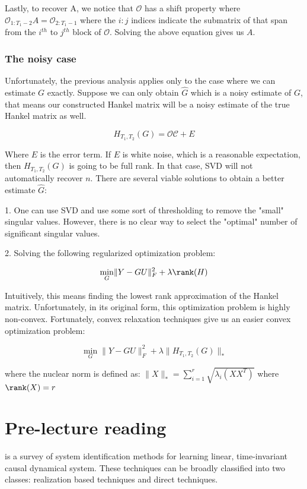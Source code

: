 \documentclass{article}[12pt]
\begin{document}
Lastly, to recover A, we notice that $\mathcal{O}$ has a shift property where $\mathcal{O}_{1:T_1-2}A = \mathcal{O}_{2:T_1-1}$ where the $i:j$ indices indicate the submatrix of that span from the $i^{th}$ to $j^{th}$ block of $\mathcal{O}$. Solving the above equation gives us $A$.

\subsubsection{The noisy case}
Unfortunately, the previous analysis applies only to the case where we can estimate $G$ exactly. Suppose we can only obtain $\hat{G}$ which is a noisy estimate of $G$, that means our constructed Hankel matrix will be a noisy estimate of the true Hankel matrix as well.

$$ H_{T_1, T_2}(G)=\mathcal{O}\mathcal{C} + E $$

Where $E$ is the error term. If $E$ is white noise, which is a reasonable expectation, then $H_{T_1, T_2}(G)$ is going to be full rank. In that case, SVD will not automatically recover $n$. There are several viable solutions to obtain a better estimate $\hat{G}$:

1. One can use SVD and use some sort of thresholding to remove the "small" singular values. However, there is no clear way to select the "optimal" number of significant singular values.

2. Solving the following regularized optimization problem:

$$\min_G \rVert Y - GU\rVert_F^2 + \lambda \rank(H) $$

Intuitively, this means finding the lowest rank approximation of the Hankel matrix. Unfortunately, in its original form, this optimization problem is highly non-convex. Fortunately, convex relaxation techniques \cite{guaranteed-minimum-rank-solutions-of-linear-matrix-equations-via-nuclear-norm-minimization} give us an easier convex optimization problem:

$$\min_G \rVert Y - GU\rVert_F^2 + \lambda \rVert H_{T_1, T_2}(G)\rVert_* $$

where the nuclear norm is defined as: $\rVert X \rVert_* = \sum_{i=1}^r \sqrt{\lambda_i(XX^T)}$ where $\rank(X)= r$

\section{Pre-lecture reading}
\cite{Viberg:1995:SMI:222618.222630} is a survey of system identification methods for learning linear, time-invariant causal dynamical system. These techniques can be broadly classified into two classes: realization based techniques and direct techniques.
\end{document}
